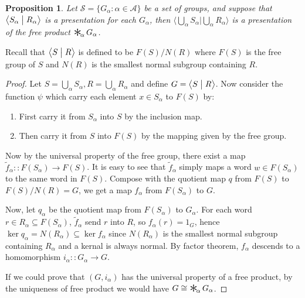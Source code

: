 \documentclass[a4paper,titlepage]{article}
\theoremstyle{remark}
\theoremstyle{definition}
\theoremstyle{definition}
\theoremstyle{plain}
\newtheorem{proposition}{Proposition}
\DeclareMathOperator*{\freeprod}{\raisebox{-0.4ex}{\scalebox{2}{$\ast$}}\!}
\begin{document}
  \begin{proposition}
    Let $\mathcal{S} = \{ G_\alpha : \alpha \in \mathcal{A} \}$ be a set of groups, and suppose that
    $\big\langle S_\alpha \bigm| R_\alpha \big\rangle$ is a presentation for each $G_\alpha$, then 
    $\Big\langle \bigcup\limits_\alpha S_\alpha \mathrel{\Big|} \bigcup\limits_\alpha R_\alpha \Big\rangle$
    is a presentation of the free product $\freeprod_\alpha G_\alpha$.
  \end{proposition}

  Recall that $\big\langle S \bigm| R \big\rangle$ is defined to be $F(S) / N(R)$ where $F(S)$ is
  the free group of $S$ and $N(R)$ is the smallest normal subgroup containing $R$.

  \begin{proof}
    Let $S = \bigcup_\alpha S_\alpha, R = \bigcup_\alpha R_\alpha$ and define 
    $G = \big\langle S \bigm| R \big\rangle$. Now consider the function $\psi$ which
    carry each element $x \in S_\alpha$ to $F(S)$ by:
    \begin{enumerate}
      \item First carry it from $S_\alpha$ into $S$ by the inclusion map.
      \item Then carry it from $S$ into $F(S)$ by the mapping given by the free group.
    \end{enumerate}
    Now by the universal property of the free group, there exist a map 
    $\tilde{f}_\alpha :: F(S_\alpha) \to F(S)$. It is easy to see that $\tilde{f}_\alpha$
    simply maps a word $w \in F(S_\alpha)$ to the same word in $F(S)$.
    Compose with the quotient map $q$ from $F(S)$ to $F(S) / N(R) = G$, we get a map $f_\alpha$ from
    $F(S_\alpha)$ to $G$. 

    Now, let $q_\alpha$ be the quotient map from $F(S_\alpha)$ to $G_\alpha$.
    For each word $r \in R_\alpha \subseteq F(S_\alpha)$, $\tilde{f}_\alpha$ send $r$ into $R$,
    so $f_\alpha(r) = 1_G$, hence $\ker q_\alpha = N(R_\alpha) \subseteq \ker f_{\alpha}$ since $N(R_\alpha)$ is the smallest
    normal subgroup containing $R_\alpha$ and a kernal is always normal. By factor theorem, $f_\alpha$
    descends to a homomorphism $i_\alpha :: G_\alpha \to G$.

    If we could prove that $(G, i_\alpha)$ has the universal property of a free product, by the uniqueness
    of free product we would have $G \cong \freeprod_\alpha G_\alpha$.


\end{proof}
\end{document}
